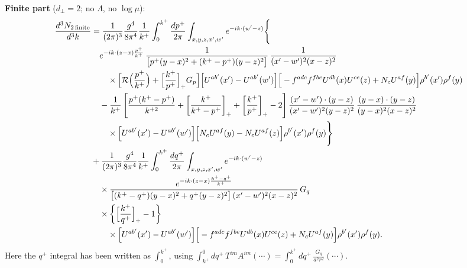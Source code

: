 \documentclass[10pt]{article}
\numberwithin{equation}{section}
\begin{document}
\textbf{Finite part} ($d_{\perp}=2$; no $\Lambda$, no $\log\mu$):
\begin{align}
\frac{d^{3}N_{2\,\rm finite}}{d^{3}k}&=\frac{1}{(2\pi)^{3}}\frac{g^{4}}{8\pi^{4}}\frac{1}{k^{+}}\int_{0}^{k^{+}}\frac{dp^{+}}{2\pi}\int_{x,y,z,x',w'}e^{-ik\cdot(w'-z)}\Bigg\{\notag\\&\quad
e^{-ik\cdot(z-x)\frac{p^{+}}{k^{+}}}\,\frac{1}{\big[p^{+}(y-x)^{2}+(k^{+}-p^{+})(y-z)^{2}\big]}\,\frac{1}{(x'-w')^{2}(x-z)^{2}}\notag\\
&\qquad\times\Big[\mathcal{R}\Big(\frac{p^{+}}{k^{+}}\Big)+\Big[\frac{k^{+}}{p^{+}}\Big]_{+}G_{p}\Big]\Big[U^{ab'}(x')-U^{ab'}(w')\Big]\Big[-f^{adc}f^{fbe}U^{db}(x)U^{ce}(z)+N_{c}U^{af}(y)\Big]\rho^{b'}(x')\rho^{f}(y)\notag\\
&\quad-\frac{1}{k^{+}}\left[\frac{p^{+}(k^{+}-p^{+})}{k^{+2}}+\left[\frac{k^{+}}{k^{+}-p^{+}}\right]_{+}+\left[\frac{k^{+}}{p^{+}}\right]_{+}-2\right]\frac{(x'-w')\cdot(y-z)}{(x'-w')^{2}(y-z)^{2}}\,\frac{(y-x)\cdot(y-z)}{(y-x)^{2}(x-z)^{2}}\notag\\
&\qquad\times\Big[U^{ab'}(x')-U^{ab'}(w')\Big]\Big[N_{c}U^{af}(y)-N_{c}U^{af}(z)\Big]\rho^{b'}(x')\rho^{f}(y)\Bigg\}\notag\\
&+\frac{1}{(2\pi)^{3}}\frac{g^{4}}{8\pi^{4}}\frac{1}{k^{+}}\int_{0}^{k^{+}}\frac{dq^{+}}{2\pi}\int_{x,y,z,x',w'}e^{-ik\cdot(w'-z)}\notag\\&\quad\times
\frac{e^{-ik\cdot(z-x)\frac{k^{+}-q^{+}}{k^{+}}}}{\big[(k^{+}-q^{+})(y-x)^{2}+q^{+}(y-z)^{2}\big]\,(x'-w')^{2}(x-z)^{2}}\,G_{q}\notag\\&\quad\times\left\{\Big[\frac{k^{+}}{q^{+}}\Big]_{+}-1\right\}\notag\\
&\qquad\times\Big[U^{ab'}(x')-U^{ab'}(w')\Big]\Big[-f^{adc}f^{fbe}U^{db}(x)U^{ce}(z)+N_{c}U^{af}(y)\Big]\rho^{b'}(x')\rho^{f}(y).
\label{eq:finfin}
\end{align}
Here the $q^{+}$ integral has been written as $\int_{0}^{k^{+}}$, using $\int_{k^{+}}^{0}dq^{+}\,T^{im}A^{im}(\cdots)=\int_{0}^{k^{+}}dq^{+}\,\frac{G_{q}}{a^{2}r^{2}}(\cdots)$.
\end{document}
